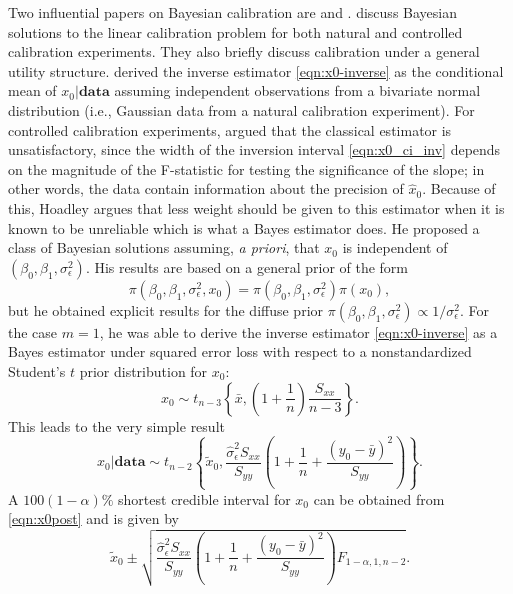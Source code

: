 \documentclass[cmfont,usenames,dvipsnames,leqno]{afit-etd}\usepackage[]{graphicx}\usepackage[]{color}
\newcommand{\wh}[1]{\ensuremath{\widehat{#1}}}
\newcommand{\wt}[1]{\ensuremath{\widetilde{#1}}}
\begin{document}
Two influential papers on Bayesian calibration are \citet{hoadley_bayesian_1970} and \citet{hunter_bayesian_1981}. \citet[chap. 10]{aitchison_statistical_1980} discuss Bayesian solutions to the linear calibration problem for both natural and controlled calibration experiments. They also briefly discuss calibration under a general utility structure. \citet{dunsmore_bayesian_1967} derived the inverse estimator \eqref{eqn:x0-inverse} as the conditional mean of $x_0|\mathbf{data}$ assuming independent observations from a bivariate normal distribution (i.e., Gaussian data from a natural calibration experiment). For controlled calibration experiments, \citet{hoadley_bayesian_1970} argued that the classical estimator is unsatisfactory, since the width of the inversion interval \eqref{eqn:x0_ci_inv} depends on the magnitude of the F-statistic for testing the significance of the slope; in other words, the data contain information about the precision of $\wh{x}_0$. Because of this, Hoadley argues that less weight should be given to this estimator when it is known to be unreliable which is what a Bayes estimator does. He proposed a class of Bayesian solutions assuming, \textit{a priori}, that $x_0$ is independent of $(\beta_0, \beta_1, \sigma_\epsilon^2)$. His results are based on a general prior of the form 
\begin{equation*}
  \pi\left(\beta_0, \beta_1, \sigma_\epsilon^2, x_0\right) = \pi\left(\beta_0, \beta_1, \sigma_\epsilon^2\right) \pi\left(x_0\right), 
\end{equation*}
but he obtained explicit results for the diffuse prior $\pi\left(\beta_0, \beta_1, \sigma_\epsilon^2\right) \propto 1/\sigma_\epsilon^2$. For the case $m=1$, he was able to derive the inverse estimator \eqref{eqn:x0-inverse} as a Bayes estimator under squared error loss with respect to a nonstandardized Student's $t$ prior distribution for $x_0$:
\begin{equation}
\label{eqn:x0prior}
  x_0 \sim t_{n-3}\left\{\bar{x}, \left(1+\frac{1}{n}\right)\frac{S_{xx}}{n-3}\right\}. 
\end{equation}
This leads to the very simple result
\begin{equation}
\label{eqn:x0post}
  x_0|\mathbf{data} \sim t_{n-2}\left\{\wt{x}_0, \frac{\wh{\sigma}_\epsilon^2 S_{xx}}{S_{yy}}\left( 1+\frac{1}{n}+\frac{(y_0 - \bar{y})^2}{S_{yy}} \right)\right\}. 
\end{equation}
A $100(1-\alpha)\%$ shortest credible interval for $x_0$ can be obtained from \eqref{eqn:x0post} and is given by
\begin{equation}
\label{eqn:sci}
  \wt{x}_0 \pm \sqrt{\frac{\wh{\sigma}_\epsilon^2 S_{xx}}{S_{yy}}\left( 1+\frac{1}{n}+\frac{(y_0 - \bar{y})^2}{S_{yy}} \right)F_{1-\alpha, 1, n-2}}.
\end{equation}
\end{document}
